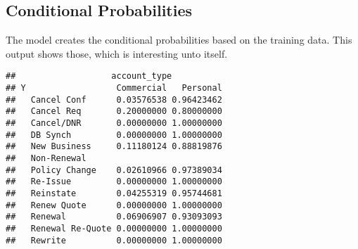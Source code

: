 \documentclass[]{article}
\begin{document}
\hypertarget{conditional-probabilities}{%
\subsection{Conditional Probabilities}\label{conditional-probabilities}}

The model creates the conditional probabilities based on the training
data. This output shows those, which is interesting unto itself.

\begin{verbatim}
##                   account_type
## Y                  Commercial   Personal
##   Cancel Conf      0.03576538 0.96423462
##   Cancel Req       0.20000000 0.80000000
##   Cancel/DNR       0.00000000 1.00000000
##   DB Synch         0.00000000 1.00000000
##   New Business     0.11180124 0.88819876
##   Non-Renewal                           
##   Policy Change    0.02610966 0.97389034
##   Re-Issue         0.00000000 1.00000000
##   Reinstate        0.04255319 0.95744681
##   Renew Quote      0.00000000 1.00000000
##   Renewal          0.06906907 0.93093093
##   Renewal Re-Quote 0.00000000 1.00000000
##   Rewrite          0.00000000 1.00000000
\end{verbatim}
\end{document}

